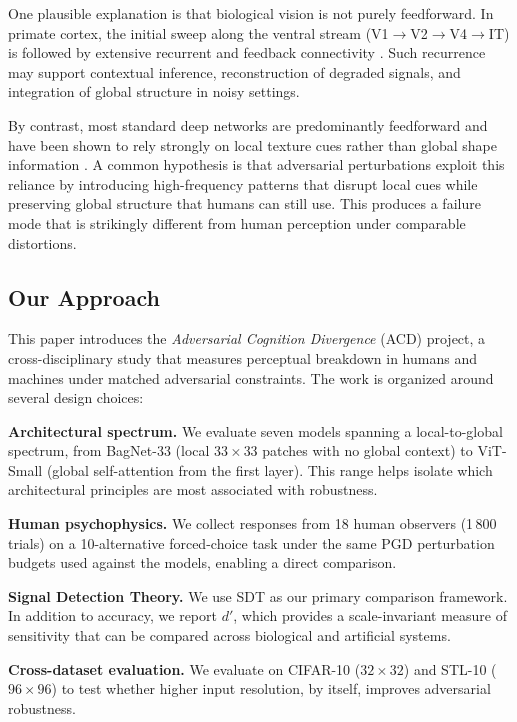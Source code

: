 \documentclass[12pt,a4paper]{article}
\begin{document}
One plausible explanation is that biological vision is not purely
feedforward. In primate cortex, the initial sweep along the ventral
stream (V1$\to$V2$\to$V4$\to$IT) is followed by extensive recurrent and
feedback connectivity \citep{dicarlo2007untangling}. Such recurrence may
support contextual inference, reconstruction of degraded signals, and
integration of global structure in noisy settings.

By contrast, most standard deep networks are predominantly feedforward
and have been shown to rely strongly on local texture cues rather than
global shape information \citep{geirhos2019imagenet,brendel2019approximating}.
A common hypothesis is that adversarial perturbations exploit this
reliance by introducing high-frequency patterns that disrupt local cues
while preserving global structure that humans can still use. This
produces a failure mode that is strikingly different from human
perception under comparable distortions.

\subsection{Our Approach}

This paper introduces the \textit{Adversarial Cognition Divergence} (ACD)
project, a cross-disciplinary study that measures perceptual breakdown
in humans and machines under matched adversarial constraints. The work
is organized around several design choices:

\textbf{Architectural spectrum.} We evaluate seven models spanning a
local-to-global spectrum, from BagNet-33 (local $33{\times}33$ patches
with no global context) to ViT-Small (global self-attention from the
first layer). This range helps isolate which architectural principles
are most associated with robustness.

\textbf{Human psychophysics.} We collect responses from 18 human
observers (1\,800 trials) on a 10-alternative forced-choice task under
the same PGD perturbation budgets used against the models, enabling a
direct comparison.

\textbf{Signal Detection Theory.} We use SDT \citep{green1966signal} as
our primary comparison framework. In addition to accuracy, we report
$d'$, which provides a scale-invariant measure of sensitivity that can
be compared across biological and artificial systems.

\textbf{Cross-dataset evaluation.} We evaluate on CIFAR-10
($32{\times}32$) and STL-10 ($96{\times}96$) to test whether higher input
resolution, by itself, improves adversarial robustness.
\end{document}

